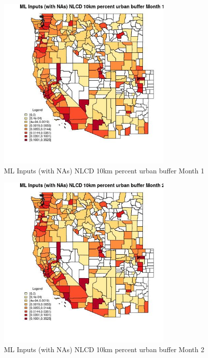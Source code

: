 \begin{figure} 
\centering  
\includegraphics[width=0.77\textwidth]{Code_Outputs/Report_ML_input_PM25_Step4_part_e_de_duplicated_aves_compiled_2019-05-21wNAs_CountyNLCD_10km_percent_urban_buffermedianMonth1.jpg} 
\caption{\label{fig:Report_ML_input_PM25_Step4_part_e_de_duplicated_aves_compiled_2019-05-21wNAsCountyNLCD_10km_percent_urban_buffermedianMonth1}ML Inputs (with NAs) NLCD 10km percent urban buffer Month 1} 
\end{figure} 
 

\begin{figure} 
\centering  
\includegraphics[width=0.77\textwidth]{Code_Outputs/Report_ML_input_PM25_Step4_part_e_de_duplicated_aves_compiled_2019-05-21wNAs_CountyNLCD_10km_percent_urban_buffermedianMonth2.jpg} 
\caption{\label{fig:Report_ML_input_PM25_Step4_part_e_de_duplicated_aves_compiled_2019-05-21wNAsCountyNLCD_10km_percent_urban_buffermedianMonth2}ML Inputs (with NAs) NLCD 10km percent urban buffer Month 2} 
\end{figure} 
 

